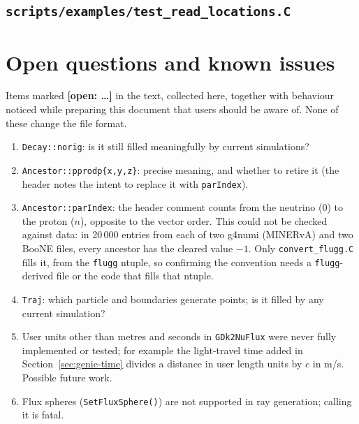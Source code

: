 \documentclass[11pt]{article}
\newcommand{\code}[1]{\texttt{#1}}
\newcommand{\sect}[1]{Section~\ref{sec:#1}}
\newcommand{\open}[1]{\textcolor{red!70!black}{\textbf{[open: #1]}}}
\begin{document}
\subsection{\code{scripts/examples/test\_read\_locations.C}}


\section{Open questions and known issues}\label{app:issues}

Items marked \open{\ldots} in the text, collected here, together with
behaviour noticed while preparing this document that users should be aware
of.  None of these change the file format.

\begin{enumerate}
\item \code{Decay::norig}: is it still filled meaningfully by current
      simulations?
\item \code{Ancestor::pprodp\{x,y,z\}}: precise meaning, and whether to
      retire it (the header notes the intent to replace it with
      \code{parIndex}).
\item \code{Ancestor::parIndex}: the header comment counts from the neutrino
      (0) to the proton ($n$), opposite to the vector order.  This could not
      be checked against data: in 20\,000 entries from each of two g4numi
      (MINERvA) and two BooNE files, every ancestor has the cleared value
      $-1$.  Only \code{convert\_flugg.C} fills it, from the \code{flugg}
      ntuple, so confirming the convention needs a \code{flugg}-derived
      file or the code that fills that ntuple.
\item \code{Traj}: which particle and boundaries generate points; is it
      filled by any current simulation?
\item User units other than metres and seconds in \code{GDk2NuFlux} were
      never fully implemented or tested; for example the light-travel time
      added in \sect{genie-time} divides a distance in user length units by
      $c$ in m/s.  Possible future work.
\item Flux spheres (\code{SetFluxSphere()}) are not supported in ray
      generation; calling it is fatal.
\end{enumerate}
\end{document}
